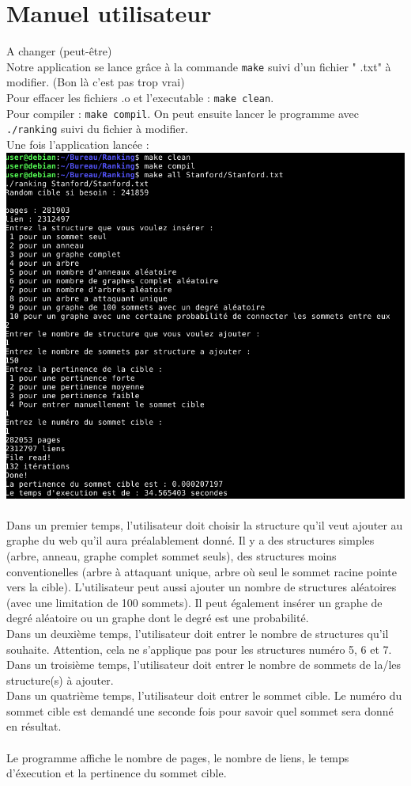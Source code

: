 \documentclass[a4paper,11pt]{article}
\begin{document}
\section{Manuel utilisateur}
	A changer (peut-être)\\
	Notre application se lance grâce à la commande \texttt{make} suivi d'un fichier " .txt" à modifier. (Bon là c'est pas trop vrai)\\
	Pour effacer les fichiers .o et l'executable : \texttt{make clean}.\\
	Pour compiler : \texttt{make compil}. On peut ensuite lancer le programme avec \texttt{./ranking} suivi du fichier à modifier.\\
	Une fois l'application lancée :\\
	\includegraphics[scale = 0.5]{Captures/manuel.png}\\
	\\
	Dans un premier temps, l'utilisateur doit choisir la structure qu'il veut ajouter au graphe du web qu'il aura préalablement donné.
	Il y a des structures simples (arbre, anneau, graphe complet sommet seuls), des structures moins conventionelles (arbre à attaquant unique, arbre où seul le sommet racine pointe vers la cible). L'utilisateur peut aussi ajouter un nombre de structures aléatoires (avec une limitation de 100 sommets). Il peut également insérer un graphe de degré aléatoire ou un graphe dont le degré est une probabilité.\\
	Dans un deuxième temps,  l'utilisateur doit entrer le nombre de structures qu'il souhaite. Attention, cela ne s'applique pas pour les structures numéro 5, 6 et 7.\\
	Dans un troisième temps, l'utilisateur doit entrer le nombre de sommets de la/les structure(s) à ajouter.\\
	Dans un quatrième temps, l'utilisateur doit entrer le sommet cible. Le numéro du sommet cible est demandé une seconde fois pour savoir quel sommet sera donné en résultat.\\
	\\
	Le programme affiche le nombre de pages, le nombre de liens, le temps d'éxecution et la pertinence du sommet cible.
\end{document}
